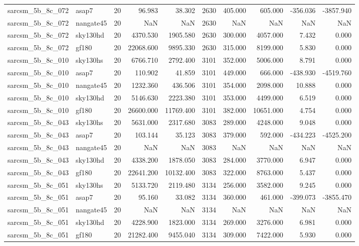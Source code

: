 \begin{longtable}{llrrrrrrrr}
sarcsm\_5b\_8c\_072 & asap7 & 20 & 96.983 & 38.302 & 2630 & 405.000 & 605.000 & -356.036 & -3857.940 \\
sarcsm\_5b\_8c\_072 & nangate45 & 20 & NaN & NaN & 2630 & NaN & NaN & NaN & NaN \\
sarcsm\_5b\_8c\_072 & sky130hd & 20 & 4370.530 & 1905.580 & 2630 & 300.000 & 4057.000 & 7.432 & 0.000 \\
sarcsm\_5b\_8c\_072 & gf180 & 20 & 22068.600 & 9895.330 & 2630 & 315.000 & 8199.000 & 5.830 & 0.000 \\
sarcsm\_5b\_8c\_010 & sky130hs & 20 & 6766.710 & 2792.400 & 3101 & 352.000 & 5006.000 & 8.791 & 0.000 \\
sarcsm\_5b\_8c\_010 & asap7 & 20 & 110.902 & 41.859 & 3101 & 449.000 & 666.000 & -438.930 & -4519.760 \\
sarcsm\_5b\_8c\_010 & nangate45 & 20 & 1232.360 & 436.506 & 3101 & 354.000 & 2098.000 & 10.888 & 0.000 \\
sarcsm\_5b\_8c\_010 & sky130hd & 20 & 5146.630 & 2223.380 & 3101 & 353.000 & 4499.000 & 6.519 & 0.000 \\
sarcsm\_5b\_8c\_010 & gf180 & 20 & 26600.000 & 11769.400 & 3101 & 382.000 & 10651.000 & 4.754 & 0.000 \\
sarcsm\_5b\_8c\_043 & sky130hs & 20 & 5631.000 & 2317.680 & 3083 & 289.000 & 4248.000 & 9.048 & 0.000 \\
sarcsm\_5b\_8c\_043 & asap7 & 20 & 103.144 & 35.123 & 3083 & 379.000 & 592.000 & -434.223 & -4525.200 \\
sarcsm\_5b\_8c\_043 & nangate45 & 20 & NaN & NaN & 3083 & NaN & NaN & NaN & NaN \\
sarcsm\_5b\_8c\_043 & sky130hd & 20 & 4338.200 & 1878.050 & 3083 & 284.000 & 3770.000 & 6.947 & 0.000 \\
sarcsm\_5b\_8c\_043 & gf180 & 20 & 22641.200 & 10132.400 & 3083 & 322.000 & 8763.000 & 5.437 & 0.000 \\
sarcsm\_5b\_8c\_051 & sky130hs & 20 & 5133.720 & 2119.480 & 3134 & 256.000 & 3582.000 & 9.245 & 0.000 \\
sarcsm\_5b\_8c\_051 & asap7 & 20 & 95.160 & 33.082 & 3134 & 360.000 & 461.000 & -399.073 & -3855.470 \\
sarcsm\_5b\_8c\_051 & nangate45 & 20 & NaN & NaN & 3134 & NaN & NaN & NaN & NaN \\
sarcsm\_5b\_8c\_051 & sky130hd & 20 & 4228.900 & 1823.000 & 3134 & 269.000 & 3276.000 & 6.981 & 0.000 \\
sarcsm\_5b\_8c\_051 & gf180 & 20 & 21282.400 & 9455.040 & 3134 & 309.000 & 7422.000 & 5.930 & 0.000 \\

\end{longtable}
